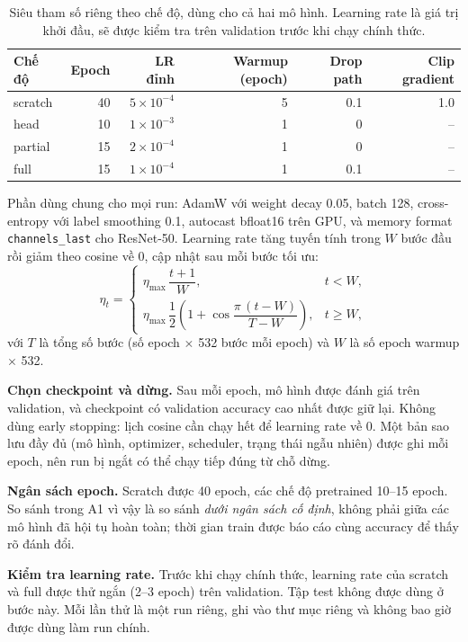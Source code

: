 \begin{table}[htbp]
\centering
\caption{Siêu tham số riêng theo chế độ, dùng cho cả hai mô hình. Learning rate là giá trị khởi đầu, sẽ được kiểm tra trên validation trước khi chạy chính thức.}
\label{tab:a1-protocol}
\small
\begin{tabular}{lrrrrr}
\toprule
Chế độ & Epoch & LR đỉnh & Warmup (epoch) & Drop path & Clip gradient \\
\midrule
scratch & 40 & \(5\times10^{-4}\) & 5 & 0.1 & 1.0 \\
head & 10 & \(1\times10^{-3}\) & 1 & 0 & -- \\
partial & 15 & \(2\times10^{-4}\) & 1 & 0 & -- \\
full & 15 & \(1\times10^{-4}\) & 1 & 0.1 & -- \\
\bottomrule
\end{tabular}
\end{table}

Phần dùng chung cho mọi run: AdamW với weight decay 0.05, batch 128, cross-entropy với label smoothing 0.1, autocast bfloat16 trên GPU, và memory format \texttt{channels\_last} cho ResNet-50. Learning rate tăng tuyến tính trong \(W\) bước đầu rồi giảm theo cosine về 0, cập nhật sau mỗi bước tối ưu:
\begin{equation}
\eta_t=
\begin{cases}
\eta_{\max}\,\dfrac{t+1}{W}, & t<W,\\[0.6em]
\eta_{\max}\,\dfrac{1}{2}\left(1+\cos\dfrac{\pi\,(t-W)}{T-W}\right), & t\ge W,
\end{cases}
\end{equation}
với \(T\) là tổng số bước (số epoch \(\times\) 532 bước mỗi epoch) và \(W\) là số epoch warmup \(\times\) 532.

\textbf{Chọn checkpoint và dừng.} Sau mỗi epoch, mô hình được đánh giá trên validation, và checkpoint có validation accuracy cao nhất được giữ lại. Không dùng early stopping: lịch cosine cần chạy hết để learning rate về 0. Một bản sao lưu đầy đủ (mô hình, optimizer, scheduler, trạng thái ngẫu nhiên) được ghi mỗi epoch, nên run bị ngắt có thể chạy tiếp đúng từ chỗ dừng.

\textbf{Ngân sách epoch.} Scratch được 40 epoch, các chế độ pretrained 10--15 epoch. So sánh trong A1 vì vậy là so sánh \emph{dưới ngân sách cố định}, không phải giữa các mô hình đã hội tụ hoàn toàn; thời gian train được báo cáo cùng accuracy để thấy rõ đánh đổi.

\textbf{Kiểm tra learning rate.} Trước khi chạy chính thức, learning rate của scratch và full được thử ngắn (2--3 epoch) trên validation. Tập test không được dùng ở bước này. Mỗi lần thử là một run riêng, ghi vào thư mục riêng và không bao giờ được dùng làm run chính.

